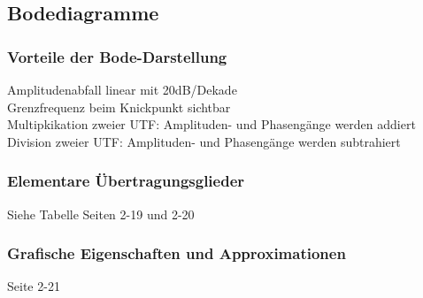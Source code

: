 \subsection{Bodediagramme}
\subsubsection{Vorteile der Bode-Darstellung}
Amplitudenabfall linear mit 20dB/Dekade\\
Grenzfrequenz beim Knickpunkt sichtbar\\
Multipkikation zweier UTF: Amplituden- und Phasengänge werden addiert\\
Division zweier UTF: Amplituden- und Phasengänge werden subtrahiert\\
\subsubsection{Elementare Übertragungsglieder}
Siehe Tabelle Seiten 2-19 und 2-20
\subsubsection{Grafische Eigenschaften und Approximationen}
Seite 2-21
